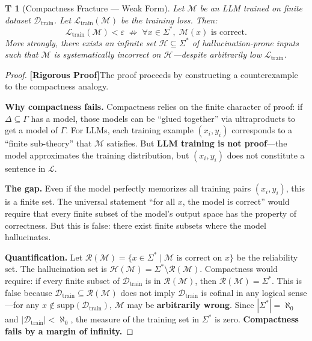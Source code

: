 \documentclass[12pt,a4paper]{article}
\newtheorem{theorem}Theorem[section]
\theoremstyle{remark}
\newcommand{\Lang}{\mathcal{L}}
\newcommand{\rigorous}{\textnormal{\textbf{[Rigorous Proof]}}}
\begin{document}
\begin{theorem}[Compactness Fracture --- Weak Form]\label{thm:compactness_fracture_weak}
Let \(\mathcal{M}\) be an LLM trained on finite dataset \(\mathcal{D}_{\text{train}}\). Let \(\mathcal{L}_{\text{train}}(\mathcal{M})\) be the training loss. Then:
\begin{equation}\label{eq:false_compactness}
    \mathcal{L}_{\text{train}}(\mathcal{M}) < \varepsilon
    \;\not\Longrightarrow\;
    \forall x \in \Sigma^*,\; \mathcal{M}(x) \text{ is correct}.
\end{equation}
More strongly, there exists an infinite set \(\mathcal{H} \subseteq \Sigma^*\) of hallucination-prone inputs such that \(\mathcal{M}\) is systematically incorrect on \(\mathcal{H}\)---despite arbitrarily low \(\mathcal{L}_{\text{train}}\).
\end{theorem}
\begin{proof}
\rigorous The proof proceeds by constructing a counterexample to the compactness analogy.

\textbf{Why compactness fails.} Compactness relies on the finite character of proof: if \(\Delta \subseteq \Gamma\) has a model, those models can be ``glued together'' via ultraproducts to get a model of \(\Gamma\). For LLMs, each training example \((x_i, y_i)\) corresponds to a ``finite sub-theory'' that \(\mathcal{M}\) satisfies. But \textbf{LLM training is not proof}---the model approximates the training distribution, but \((x_i, y_i)\) does not constitute a sentence in \(\Lang\).

\textbf{The gap.} Even if the model perfectly memorizes all training pairs \((x_i, y_i)\), this is a finite set. The universal statement ``for all \(x\), the model is correct'' would require that every finite subset of the model's output space has the property of correctness. But this is false: there exist finite subsets where the model hallucinates.

\textbf{Quantification.} Let \(\mathcal{R}(\mathcal{M}) = \{x \in \Sigma^* \mid \mathcal{M} \text{ is correct on } x\}\) be the reliability set. The hallucination set is \(\mathcal{H}(\mathcal{M}) = \Sigma^* \setminus \mathcal{R}(\mathcal{M})\). Compactness would require: if every finite subset of \(\mathcal{D}_{\text{train}}\) is in \(\mathcal{R}(\mathcal{M})\), then \(\mathcal{R}(\mathcal{M}) = \Sigma^*\). This is false because \(\mathcal{D}_{\text{train}} \subseteq \mathcal{R}(\mathcal{M})\) does not imply \(\mathcal{D}_{\text{train}}\) is cofinal in any logical sense---for any \(x \notin \text{supp}(\mathcal{D}_{\text{train}})\), \(\mathcal{M}\) may be \textbf{arbitrarily wrong}. Since \(|\Sigma^*| = \aleph_0\) and \(|\mathcal{D}_{\text{train}}| < \aleph_0\), the measure of the training set in \(\Sigma^*\) is zero. \textbf{Compactness fails by a margin of infinity.}
\end{proof}
\end{document}
